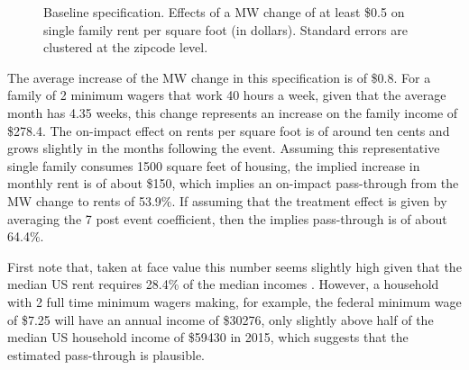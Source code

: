 \documentclass{article}
\begin{document}
\begin{figure}[h!]
    \centering
    \caption{Baseline specification. Effects of a MW change of at least \$0.5 on single family rent per square foot (in dollars). Standard errors are clustered at the zipcode level.}
    \label{fig:fig1}
\end{figure}

The average increase of the MW change in this specification is of \$0.8. For a family of 2 minimum wagers that work 40 hours a week, given that the average month has 4.35 weeks, this change represents an increase on the family income of \$278.4. The on-impact effect on rents per square foot is of around ten cents and grows slightly in the months following the event. Assuming this representative single family consumes 1500 square feet of housing, the implied increase in monthly rent is of about \$150, which implies an on-impact pass-through from the MW change to rents of 53.9\%. If assuming that the treatment effect is given by averaging the 7 post event coefficient, then the implies pass-through is of about 64.4\%.

First note that, taken at face value this number seems slightly high given that the  median US rent requires 28.4\% of the median incomes \parencite{bi}. However, a household with 2 full time minimum wagers making, for example, the federal minimum wage of \$7.25 will have an annual income of \$30276, only slightly above half of the median US household income of \$59430 in 2015, which suggests that the estimated pass-through is plausible. 
\end{document}
